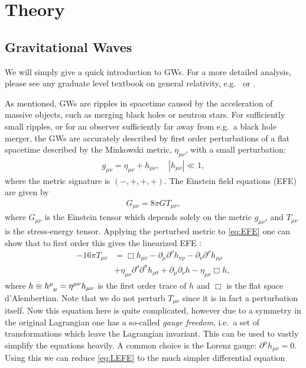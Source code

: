 \documentclass[%
reprint,
amsmath,amssymb,
aps,
]{revtex4-2}
\newcommand{\p}{\partial}
\begin{document}
\section{Theory}
\label{sec:theory}
\subsection{Gravitational Waves}
We will simply give a quick introduction to GWs. For a more detailed analysis, please see any graduate level textbook on general relativity, e.g.~\cite{Carroll} or \cite{Wald}.

As mentioned, GWs are ripples in spacetime caused by the acceleration of massive objects, such as merging black holes or neutron stars. For sufficiently small ripples, or for an observer sufficiently far away from e.g.~a black hole merger, the GWs are accurately described by first order perturbations of a flat spacetime described by the Minkowski metric, $\eta_{\mu\nu}$, with a small perturbation:
\begin{align}
	g_{\mu\nu}=\eta_{\mu\nu}+h_{\mu\nu},\quad|h_{\mu\nu}|\ll1,
\end{align}
where the metric signature is $(-,+,+,+)$. The Einstein field equations (EFE) are given by
\begin{align}
	G_{\mu\nu}=8\pi GT_{\mu\nu},
	\label{eq:EFE}
\end{align}
where $G_{\mu\nu}$ is the Einstein tensor which depends solely on the metric $g_{\mu\nu}$, and $T_{\mu\nu}$ is the stress-energy tensor. Applying the perturbed metric to \eqref{eq:EFE} one can show that to first order this gives the linearized EFE \cite{Carroll}:
\begin{align}
	-16\pi T_{\mu\nu}&=\Box h_{\mu\nu}-\p_\mu\p^\rho h_{\nu\rho}-\p_\nu\p^\rho h_{\mu\rho}\nonumber\\
	&+\eta_{\mu\nu}\p^\rho\p^\sigma h_{\rho\sigma}+\p_\mu \p_\nu h-\eta_{\mu\nu}\Box h,
	\label{eq:LEFE}
\end{align}
where $h\equiv \tensor{h}{^\mu_\mu}=\eta^{\mu\nu}h_{\mu\nu}$ is the first order trace of $h$ and $\Box$ is the flat space d'Alembertian. Note that we do not perturb $T_{\mu\nu}$ since it is in fact a perturbation itself. Now this equation here is quite complicated, however due to a symmetry in the original Lagrangian one has a so-called \textit{gauge freedom}, i.e.~a set of transformations which leave the Lagrangian invariant. This can be used to vastly simplify the equations heavily. A common choice is the Lorenz gauge: $\p^\mu h_{\mu\nu}=0$. Using this we can reduce \eqref{eq:LEFE} to the much simpler differential equation
\end{document}
